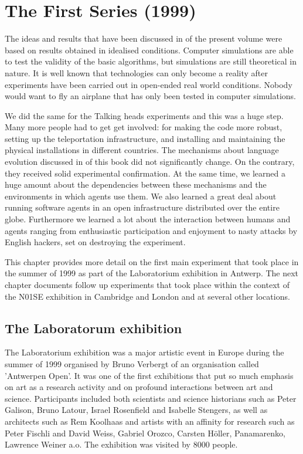 \chapter{The First Series (1999)}
\label{c:first-series}

The ideas and results that have been discussed in  of the present volume 
were based on results obtained in idealised conditions. Computer simulations are able to 
test the validity of the basic algorithms, but simulations are still theoretical in nature. 
It is well known that technologies can only become a reality after 
experiments have been carried out in open-ended real world conditions. Nobody would want to fly an airplane that 
has only been tested in computer simulations. 

We did the same for the Talking heads experiments and this was a huge step. Many more people had to get
get involved: for making the code more robust, setting up the teleportation infrastructure, and installing and 
maintaining the physical installations in different countries.  
The mechanisms about language evolution discussed in  of this book did not significantly change. On the contrary, 
they received solid experimental confirmation. At the same time, we learned a huge amount about the dependencies
between these mechanisms and the environments in which agents use them. We also learned a great deal about running software 
agents in an open infrastructure distributed over the entire globe. Furthermore we learned a lot 
about the interaction between humans and agents ranging from 
enthusiastic participation and enjoyment to nasty attacks by English hackers, set on destroying the experiment. 

This chapter provides more detail on the first main experiment that took place in the summer of 1999 as 
part of the Laboratorium exhibition in Antwerp. The next chapter documents follow up experiments that took place
within the context of the N01SE exhibition in Cambridge and London and at several other locations. 

\section{The Laboratorum exhibition} 

The Laboratorium
exhibition was a major artistic event in Europe during the summer of 1999 organised by 
Bruno Verbergt of an organisation called 'Antwerpen Open'.
It was one of the first exhibitions that put so much emphasis on art as a research 
activity and on profound interactions between art and science.
Participants included both scientists and science historians such as Peter Galison, Bruno Latour, Israel Rosenfield
and Isabelle Stengers, as well as architects such as Rem Koolhaas and artists with an affinity for research 
such as Peter Fischli and David Weiss, Gabriel Orozco, Carsten H\"oller, Panamarenko, Lawrence Weiner a.o. 
The exhibition was visited by 8000 people. 

